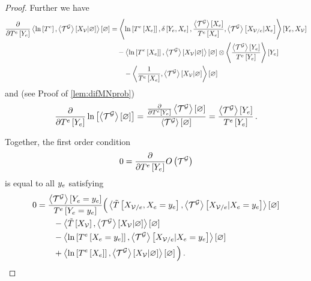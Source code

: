 \begin{proof}
	Further we have
	\begin{align*}
		\frac{\partial }{\partial T^{e}\left[Y_{e}\right]} \left\langle  \ln \left[ T^{e} \right], \left\langle \mathcal{T}^{\mathcal{G}}\right\rangle \left[ X_{\mathcal{V}} | \varnothing \right]\right\rangle \left[ \varnothing \right] 
		& = \left\langle \ln \left[ T^{e}\left[X_{e}\right] \right],
	 	\delta\left[Y_{e},X_{e}\right], 
		\frac{\left\langle \mathcal{T}^{\mathcal{G}}\right\rangle \left[ X_{e} \right]}{T^{e}\left[X_{e}\right]}, 
		\left\langle \mathcal{T}^{\mathcal{G}}\right\rangle \left[ X_{\mathcal{V}/e} | X_{e} \right] \right\rangle \left[ Y_{e},X_{\mathcal{V}} \right] \\
		& \quad -  \left\langle \ln \left[ T^{e}\left[X_{e}\right] \right],\left\langle \mathcal{T}^{\mathcal{G}}\right\rangle \left[ X_{\mathcal{V}} | \varnothing \right]\right\rangle \left[ \varnothing \right]
		 \otimes \left\langle \frac{\left\langle \mathcal{T}^{\mathcal{G}}\right\rangle \left[ Y_{e} \right]}{T^{e}\left[Y_{e}\right]}
		\right\rangle \left[ Y_{e} \right] \\
		& \quad\quad - \left\langle  \frac{1}{T^{e}\left[X_{e}\right]}, \left\langle \mathcal{T}^{\mathcal{G}}\right\rangle \left[ X_{\mathcal{V}} | \varnothing \right]\right\rangle \left[ \varnothing \right]
	\end{align*}
	and (see Proof of \ref{lem:difMNprob})
	\begin{align*}
		\frac{\partial }{\partial T^{e}\left[Y_{e}\right]} \ln \left[ \left\langle \mathcal{T}^{\mathcal{G}}\right\rangle \left[ \varnothing \right] \right]
		 = \frac{\frac{\partial }{\partial T^{e}\left[Y_{e}\right]} \left\langle \mathcal{T}^{\mathcal{G}}\right\rangle \left[ \varnothing \right]}{\left\langle \mathcal{T}^{\mathcal{G}}\right\rangle \left[ \varnothing \right]} 		
		 = \frac{\left\langle \mathcal{T}^{\mathcal{G}}\right\rangle \left[ Y_{e} \right]}{T^{e}\left[Y_{e}\right]} \, .
	\end{align*}
	
	Together, the first order condition
	\begin{align*}
		0 = \frac{\partial }{\partial T^{e}\left[Y_{e}\right]} O\left(\mathcal{T}^{\mathcal{G}}\right)
	\end{align*}
	is equal to all $y_{e}$ satisfying%
	\begin{align*}
		0 & = \frac{\left\langle \mathcal{T}^{\mathcal{G}}\right\rangle \left[ Y_{e}=y_{e} \right]}{T^{e}\left[Y_{e}=y_{e}\right]}
		 \Big(
		 	\left\langle \tilde{T}\left[X_{\mathcal{V}/e},X_{e}=y_{e}\right], \left\langle \mathcal{T}^{\mathcal{G}}\right\rangle \left[ X_{\mathcal{V}/e} | X_{e}=y_{e} \right]\right\rangle \left[ \varnothing \right] \\
			&\quad \quad - \left\langle \tilde{T}\left[X_{\mathcal{V}}\right], \left\langle \mathcal{T}^{\mathcal{G}}\right\rangle \left[ X_{\mathcal{V}} | \varnothing \right]\right\rangle \left[ \varnothing \right]  \\
			&\quad \quad - \left\langle \ln \left[ T^{e}\left[X_{e}=y_{e}\right] \right], \left\langle \mathcal{T}^{\mathcal{G}}\right\rangle \left[ X_{\mathcal{V}/e} | X_{e}=y_{e} \right]\right\rangle \left[ \varnothing \right] \\
			&\quad \quad + \left\langle \ln \left[ T^{e}\left[X_{e}\right] \right], \left\langle \mathcal{T}^{\mathcal{G}}\right\rangle \left[ X_{\mathcal{V}} | \varnothing \right]\right\rangle \left[ \varnothing \right] 
		 \Big) \, . 
	\end{align*}
	

\end{proof}
